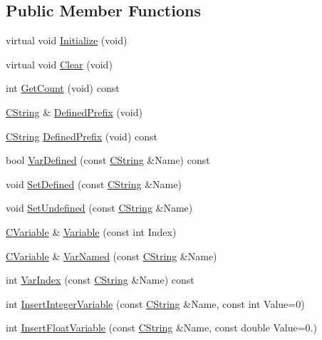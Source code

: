 \subsection*{Public Member Functions}
\begin{DoxyCompactItemize}
\item 
virtual void \hyperlink{classCConfiguration_a20cb2322663278d521175a1938407e71}{Initialize} (void)
\item 
virtual void \hyperlink{classCConfiguration_abb885f482171f99631785dc3d0685aab}{Clear} (void)
\item 
int \hyperlink{classCConfiguration_a9049c49228af7c7a6e12882f8e7356f4}{Get\-Count} (void) const 
\item 
\hyperlink{classCString}{C\-String} \& \hyperlink{classCConfiguration_ae083d99364629d6c45698449b0d39ee6}{Defined\-Prefix} (void)
\item 
\hyperlink{classCString}{C\-String} \hyperlink{classCConfiguration_aec3c760ef7a7f5571a2489dfdac47b69}{Defined\-Prefix} (void) const 
\item 
bool \hyperlink{classCConfiguration_a2bd48a783d6a2c0a71e74dfab84211df}{Var\-Defined} (const \hyperlink{classCString}{C\-String} \&Name) const 
\item 
void \hyperlink{classCConfiguration_a5ca7d9dd9858099936ff9b581a7ab79b}{Set\-Defined} (const \hyperlink{classCString}{C\-String} \&Name)
\item 
void \hyperlink{classCConfiguration_a2e9b2e96b342d8f3c8c2ae06e0f80019}{Set\-Undefined} (const \hyperlink{classCString}{C\-String} \&Name)
\item 
\hyperlink{classCVariable}{C\-Variable} \& \hyperlink{classCConfiguration_a9983c5dd69ea4fe163c7043381e1da52}{Variable} (const int Index)
\item 
\hyperlink{classCVariable}{C\-Variable} \& \hyperlink{classCConfiguration_a0f6e583cbf9d17f864efa3d982730a55}{Var\-Named} (const \hyperlink{classCString}{C\-String} \&Name)
\item 
int \hyperlink{classCConfiguration_a2c1cace09788549acc212cd10f822b31}{Var\-Index} (const \hyperlink{classCString}{C\-String} \&Name) const 
\item 
int \hyperlink{classCConfiguration_a34ca50d4c0c92cbe032abd2e53804de3}{Insert\-Integer\-Variable} (const \hyperlink{classCString}{C\-String} \&Name, const int Value=0)
\item 
int \hyperlink{classCConfiguration_a998e32d3c6cddecf064e020748cbe331}{Insert\-Float\-Variable} (const \hyperlink{classCString}{C\-String} \&Name, const double Value=0.)

\end{DoxyCompactItemize}
